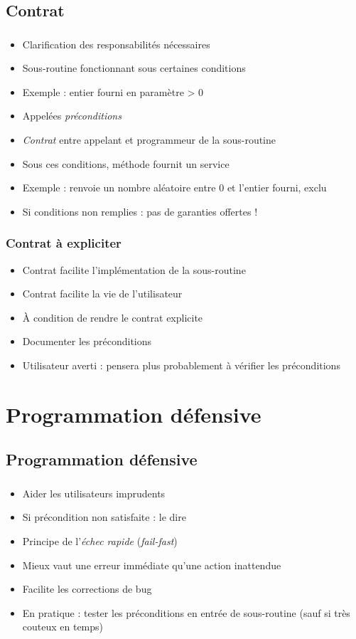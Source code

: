 \documentclass[english, french]{beamer}
\begin{document}
\subsection{Contrat}
\begin{frame}
	\frametitle{\subsecname}
	\begin{itemize}
		\item Clarification des responsabilités nécessaires
		\item Sous-routine fonctionnant sous certaines conditions
		\item Exemple : entier fourni en paramètre > 0
		\item Appelées \emph{préconditions}
		\item \emph{Contrat} entre appelant et programmeur de la sous-routine
		\item Sous ces conditions, méthode fournit un service
		\item Exemple : renvoie un nombre aléatoire entre 0 et l’entier fourni, exclu
		\item Si conditions non remplies : pas de garanties offertes !
	\end{itemize}
\end{frame}

\begin{frame}
	\frametitle{Contrat à expliciter}
	\begin{itemize}
		\item Contrat facilite l’implémentation de la sous-routine
		\item Contrat facilite la vie de l’utilisateur
		\item À condition de rendre le contrat explicite
		\item Documenter les préconditions
		\item Utilisateur averti : pensera plus probablement à vérifier les préconditions
	\end{itemize}
\end{frame}

\section{Programmation défensive}
\subsection{Programmation défensive}
\begin{frame}
	\frametitle{\subsecname}
	\begin{itemize}
		\item Aider les utilisateurs imprudents
		\item Si précondition non satisfaite : le dire
		\item Principe de l’\emph{échec rapide} (\emph{fail-fast})
		\item Mieux vaut une erreur immédiate qu’une action inattendue
		\item Facilite les corrections de bug
		\item En pratique : tester les préconditions en entrée de sous-routine {\tiny (sauf si très couteux en temps)}
	\end{itemize}
\end{frame}
\end{document}
